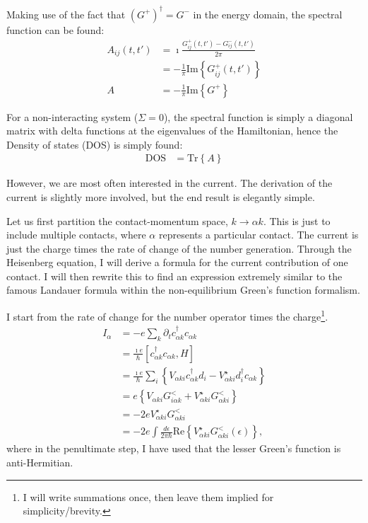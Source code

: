 Making use of the fact that $\left(G^+\right)^\dagger = G^-$ in the energy domain, the spectral function can be found:
\begin{align*}
A_{ij}(t, t') &= \imath \frac{G^+_{ij}(t, t') - G^-_{ij}(t, t')}{2\pi}\\
&= - \frac{1}{\pi} \text{Im}\left\{ G^+_{ij}(t, t')\right\} \\
A &=- \frac{1}{\pi} \text{Im}\left\{ G^+\right\}
\end{align*}

For a non\hyp{}interacting system ($\Sigma=0$), the spectral function is simply a diagonal matrix with delta functions at the eigenvalues of the Hamiltonian, hence the Density of states (DOS) is simply found:
\begin{align}
\text{DOS} &= \text{Tr}\left\{A\right\}
\label{eq:dos}
\end{align}


However, we are most often interested in the current. The derivation of the current is slightly more involved, but the end result is elegantly simple.

Let us first partition the contact-momentum space, $k \rightarrow \alpha k$. This is just to include multiple contacts, where $\alpha$ represents a particular contact.  The current is just the charge times the rate of change of the number generation. Through the Heisenberg equation, I will derive a formula for the current contribution of one contact. I will then rewrite this to find an expression extremely similar to the famous Landauer formula within the non-equilibrium Green's function formalism.

I start from the rate of change for the number operator times the charge\footnote{I will write summations once, then leave them implied for simplicity/brevity.}.  
\begin{align*}
I_\alpha &= - e \sum_{k} \partial_t c^\dagger_{\alpha k} c_{\alpha k} \\
&= \frac{\imath e}{\hbar} \left[ c^\dagger_{\alpha k} c_{\alpha k}, H\right] \\
&= \frac{\imath e}{\hbar}\sum_i \left\{ V_{\alpha ki} c^\dagger_{\alpha k} d_i - V^\star_{\alpha ki} d_i^\dagger c_{\alpha k}\right\} \\
&= e \left\{ V_{\alpha ki} G^<_{i\alpha k} + V_{\alpha ki}^\star G^<_{\alpha ki}\right\}\\
&= -2e V^\star_{\alpha ki}G^<_{\alpha ki} \\
&= -2e \int \frac{d\epsilon}{2\pi\hbar} \text{Re}\left\{ V^\star_{\alpha ki} G^<_{\alpha ki} (\epsilon) \right\},
\end{align*}
where in the penultimate step, I have used that the lesser Green's function is anti-Hermitian. 

